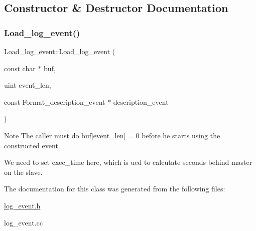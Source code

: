 \subsection{Constructor \& Destructor Documentation}
\mbox{\label{classLoad__log__event_a04af106df96259276bce210ac13badfa}} 
\subsubsection{\texorpdfstring{Load\+\_\+log\+\_\+event()}{Load\_log\_event()}}
{\footnotesize\ttfamily Load\+\_\+log\+\_\+event\+::\+Load\+\_\+log\+\_\+event (\begin{DoxyParamCaption}\item[{const char $\ast$}]{buf,  }\item[{uint}]{event\+\_\+len,  }\item[{const Format\+\_\+description\+\_\+event $\ast$}]{description\+\_\+event }\end{DoxyParamCaption})}

\begin{DoxyNote}{Note}
The caller must do buf\mbox{[}event\+\_\+len\mbox{]} = 0 before he starts using the constructed event. 
\end{DoxyNote}
We need to set exec\+\_\+time here, which is ued to calcutate seconds behind master on the slave.

The documentation for this class was generated from the following files\+:\begin{DoxyCompactItemize}
\item 
\mbox{\hyperlink{log__event_8h}{log\+\_\+event.\+h}}\item 
log\+\_\+event.\+cc\end{DoxyCompactItemize}

